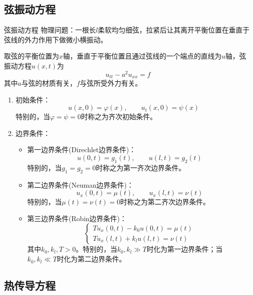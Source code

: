 \documentclass[lang = cn, scheme = chinese, thmcnt = section]{elegantbook}
\begin{document}
\subsection{弦振动方程}

\begin{definition}{弦振动方程}
	物理问题：一根长$l$柔软均匀细弦，拉紧后让其离开平衡位置在垂直于弦线的外力作用下做微小横振动。
	
	取弦的平衡位置为$x$轴，垂直于平衡位置且通过弦线的一个端点的直线为$u$轴，弦振动方程$u(x,t)$为
	$$
	u_{tt}-a^2u_{xx}=f
	$$
	其中$a$与弦的材质有关，$f$与弦所受外力有关。
	
	\begin{enumerate}
		\item 初始条件：
		$$
		u(x,0)=\varphi(x),\qquad 
		u_t(x,0)=\psi(x)
		$$
		特别的，当$\varphi=\psi=0$时称之为齐次初始条件。
		\item 边界条件：
		\begin{itemize}
			\item 第一边界条件(Direchlet边界条件)：
			$$
			u(0,t)=g_1(t),\qquad
			u(l,t)=g_2(t)
			$$
			特别的，当$g_1=g_2=0$时称之为第一齐次边界条件。
			\item 第二边界条件(Neuman边界条件)：
			$$
			u_x(0,t)=\mu(t),\qquad 
			u_x(l,t)=\nu(t)
			$$
			特别的，当$\mu(t)=\nu(t)=0$时称之为第二齐次边界条件。
			\item 第三边界条件(Robin边界条件)：
			$$
			\begin{cases}
				Tu_x(0,t)-k_0u(0,t)=\mu(t)\\
				Tu_x(l,t)+k_lu(l,t)=\nu(t)
			\end{cases}
			$$
			其中$k_0,k_l,T>0$。特别的，当$k_0,k_l\gg T$时化为第一边界条件；当$k_0,k_l\ll T$时化为第二边界条件。
		\end{itemize}
	\end{enumerate}
\end{definition}

\subsection{热传导方程}
\end{document}
